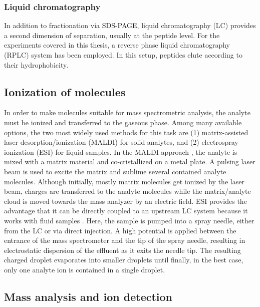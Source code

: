 \subsubsection{Liquid chromatography}

In addition to fractionation via SDS-PAGE, liquid chromatography (LC) provides 
a second dimension of separation, usually at the peptide level.
For the experiments covered in this thesis, a reverse phase liquid 
chromatography (RPLC) system has been employed.
In this setup, peptides elute according to their hydrophobicity.

\subsection{Ionization of molecules}

In order to make molecules suitable for mass spectrometric analysis, 
the analyte must be ionized and transferred to the gaseous phase.
Among many available options, the two most widely used methods for this 
task are (1) matrix-assisted laser desorption/ionization (MALDI) for solid 
analytes, and (2) electrospray ionization (ESI) for liquid samples.
In the MALDI approach \citep{Karas1988}, the analyte is mixed with a 
matrix material and co-cristallized on a metal plate. 
A pulsing laser beam is used to excite the matrix and sublime several 
contained analyte molecules. 
Although initially, mostly matrix molecules get ionized by the laser
beam, charges are transferred to the analyte molecules while the
matrix/analyte cloud is moved towards the mass analyzer by an
electric field.
ESI provides the advantage that it can be directly coupled to an
upstream LC system because it works with fluid samples \citep{Fenn1989}.
Here, the sample is pumped into a spray needle, either from the LC or via
direct injection. 
A high potential is applied between the entrance of the mass spectrometer and
the tip of the spray needle, resulting in electrostatic dispersion of the
effluent as it exits the needle tip.
The resulting charged droplet evaporates into smaller droplets until finally,
in the best case, only one analyte ion is contained in a single droplet.

\subsection{Mass analysis and ion detection}


